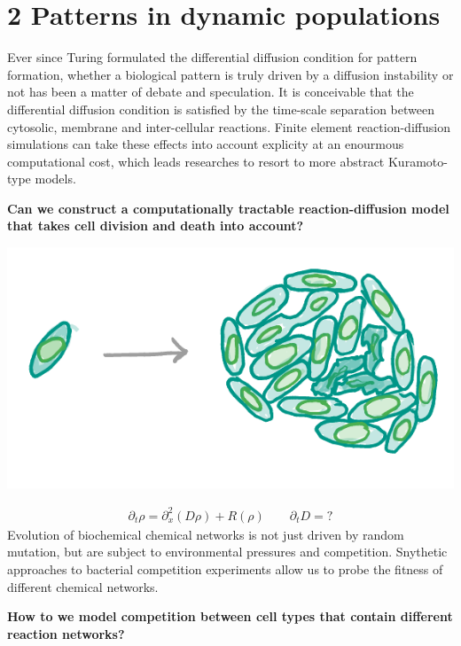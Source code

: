 \documentclass[a0,portrait]{a0poster}
\begin{document}
\section*{2 Patterns in dynamic populations}
Ever since Turing formulated the differential diffusion condition \cite{}
for pattern formation, whether a biological pattern is truly driven by a
diffusion instability or not has been a matter of debate and speculation.
\medbreak\medbreak\noindent
It is conceivable that the differential diffusion condition is satisfied
by the time-scale separation between cytosolic, membrane and inter-cellular
reactions.
\medbreak\medbreak\noindent
Finite element reaction-diffusion simulations can take these effects into
account explicity at an enourmous computational cost, which leads researches to
resort to more abstract Kuramoto-type models.
\medbreak
\begin{tcolorbox}[boxrule=2pt,arc=3.4pt,boxsep=2mm]
\begin{center}\color{DarkRed}
\textbf{Can we construct a computationally tractable reaction-diffusion model
that takes cell division and death into account?}
\end{center}
\end{tcolorbox}
\begin{center}
\includegraphics[width=0.9\linewidth]{population}
\end{center}
\large\begin{align*}
	\partial_t\rho=\partial_x^2(D\rho)+R(\rho)\qquad
	\partial_tD=?
\end{align*}
\normalsize
Evolution of biochemical chemical networks is not just driven by random mutation,
but are subject to environmental pressures and competition. Snythetic approaches
to bacterial competition experiments \cite{} allow us to probe the fitness of
different chemical networks.
\medbreak
\begin{tcolorbox}[boxrule=2pt,arc=3.4pt,boxsep=2mm]
\begin{center}\color{DarkRed}
\textbf{How to we model competition between cell types that contain
different reaction networks?}
\end{center}
\end{tcolorbox}
\end{document}
